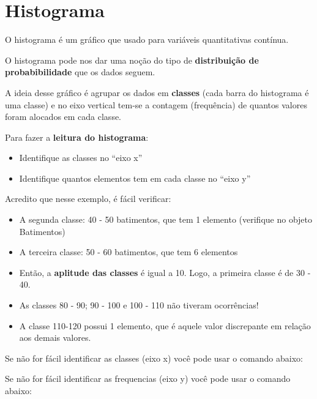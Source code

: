 \documentclass[
]{book}
\newenvironment{Shaded}{\begin{snugshade}}{\end{snugshade}}
\newcommand{\CommentTok}[1]{\textcolor[rgb]{0.56,0.35,0.01}{\textit{#1}}}
\newcommand{\FunctionTok}[1]{\textcolor[rgb]{0.13,0.29,0.53}{\textbf{#1}}}
\newcommand{\NormalTok}[1]{#1}
\newcommand{\SpecialCharTok}[1]{\textcolor[rgb]{0.81,0.36,0.00}{\textbf{#1}}}
\begin{document}
\section{Histograma}\label{histograma}

O histograma é um gráfico que usado para variáveis quantitativas contínua.

O histograma pode nos dar uma noção do tipo de \textbf{distribuição de probabibilidade} que os dados seguem.

A ideia desse gráfico é agrupar os dados em \textbf{classes} (cada barra do histograma é uma classe) e no eixo vertical tem-se a contagem (frequência) de quantos valores foram alocados em cada classe.

Para fazer a \textbf{leitura do histograma}:

\begin{itemize}
\item
  Identifique as classes no ``eixo x''
\item
  Identifique quantos elementos tem em cada classe no ``eixo y''
\end{itemize}

Acredito que nesse exemplo, é fácil verificar:

\begin{itemize}
\item
  A segunda classe: 40 - 50 batimentos, que tem 1 elemento (verifique no objeto Batimentos)
\item
  A terceira classe: 50 - 60 batimentos, que tem 6 elementos
\item
  Então, a \textbf{aplitude das classes} é igual a 10. Logo, a primeira classe é de 30 - 40.
\item
  As classes 80 - 90; 90 - 100 e 100 - 110 não tiveram ocorrências!
\item
  A classe 110-120 possui 1 elemento, que é aquele valor discrepante em relação aos demais valores.
\end{itemize}

Se não for fácil identificar as classes (eixo x) você pode usar o comando abaixo:

\begin{Shaded}
\end{Shaded}

Se não for fácil identificar as frequencias (eixo y) você pode usar o comando abaixo:
\end{document}
